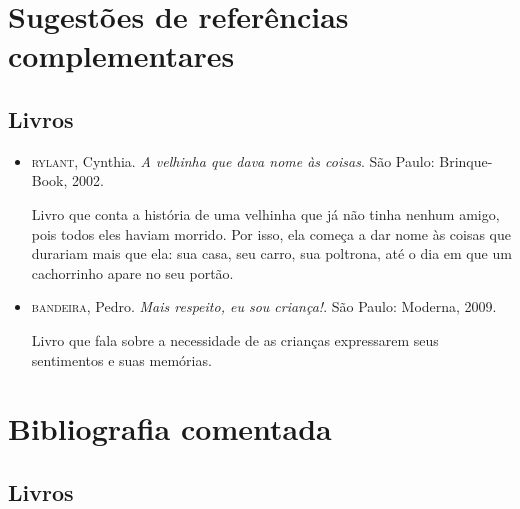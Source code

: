 \documentclass[11pt]{extarticle}
\begin{document}
\section{Sugestões de referências complementares}

\subsection{Livros} 

\begin{itemize}
\item \textsc{rylant}, Cynthia. \textit{A velhinha que dava nome às coisas}. São Paulo: Brinque-Book, 2002.

Livro que conta a história de uma velhinha que já não tinha nenhum amigo, pois todos eles haviam morrido. Por isso, ela começa a dar nome às coisas que durariam mais que ela: sua casa, seu carro, sua poltrona, até o dia em que um cachorrinho apare no seu portão.

\item \textsc{bandeira}, Pedro. \textit{Mais respeito, eu sou criança!}. São Paulo: Moderna, 2009.

Livro que fala sobre a necessidade de as crianças expressarem seus sentimentos e suas memórias.

\end{itemize}

\section{Bibliografia comentada}
\subsection{Livros}
\end{document}

